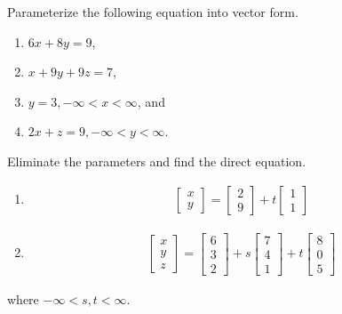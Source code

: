 \begin{Exercise}
Parameterize the following equation into vector form.
\begin{enumerate}[label=(\alph*)]
\item $6x + 8y = 9$,
\item $x + 9y + 9z = 7$,
\item $y = 3, -\infty < x < \infty$, and
\item $2x + z = 9, -\infty < y < \infty$.
\end{enumerate}
\end{Exercise}

\begin{Exercise}
Eliminate the parameters and find the direct equation.
\begin{enumerate}[label=(\alph*)]
\item \begin{align*}
\begin{bmatrix}
x\\
y
\end{bmatrix}
=
\begin{bmatrix}
2\\
9
\end{bmatrix}
+
t
\begin{bmatrix}
1\\
1
\end{bmatrix}
\end{align*}
\item \begin{align*}
\begin{bmatrix}
x\\
y\\
z
\end{bmatrix}
=
\begin{bmatrix}
6\\
3\\
2
\end{bmatrix}
+
s
\begin{bmatrix}
7\\
4\\
1
\end{bmatrix}
+
t
\begin{bmatrix}
8\\
0\\
5
\end{bmatrix}
\end{align*}
\end{enumerate}
where $-\infty < s,t < \infty$.
\end{Exercise}

